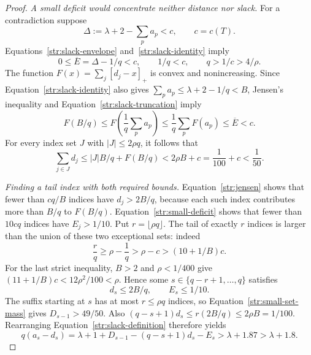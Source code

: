 \begin{proof}
\textit{A small deficit would concentrate neither distance nor slack.}
For a contradiction suppose
\[
 \Delta:=\lambda+2-\sum_pa_p<c,
 \qquad c=c(T).
\]
Equations~\eqref{str:slack-envelope} and~\eqref{str:slack-identity} imply
\begin{equation}\label{str:small-deficit}
 0\le\overline E=\Delta-1/q<c,
 \qquad 1/q<c,\qquad q>1/c>4/\rho.
\end{equation}
The function $F(x)=\sum_j[d_j-x]_+$ is convex and nonincreasing.
Since Equation~\eqref{str:slack-identity} also gives
$\sum_pa_p\le\lambda+2-1/q<B$, Jensen's inequality and
Equation~\eqref{str:slack-truncation} imply
\begin{equation}\label{str:jensen}
 F(B/q)\le F\left(\frac1q\sum_pa_p\right)
 \le\frac1q\sum_p F(a_p)\le\overline E<c.
\end{equation}
For every index set $J$ with $|J|\le2\rho q$, it follows that
\begin{equation}\label{str:small-set-mass}
 \sum_{j\in J}d_j
 \le |J|B/q+F(B/q)<2\rho B+c
 =\frac1{100}+c<\frac1{50}.
\end{equation}

\textit{Finding a tail index with both required bounds.}
Equation~\eqref{str:jensen} shows that fewer than $cq/B$ indices have
$d_j>2B/q$, because each such index contributes more than $B/q$ to
$F(B/q)$.  Equation~\eqref{str:small-deficit} shows that fewer than
$10cq$ indices have $E_j>1/10$.  Put $r=\lfloor\rho q\rfloor$.
The tail of exactly $r$ indices is larger than the union of these two
exceptional sets: indeed
\[
 \frac rq\ge\rho-\frac1q>\rho-c>(10+1/B)c.
\]
For the last strict inequality, $B>2$ and $\rho<1/400$ give
$(11+1/B)c<12\rho^2/100<\rho$.
Hence some $s\in\{q-r+1,\ldots,q\}$ satisfies
\begin{equation}\label{str:tail-index}
 d_s\le2B/q,\qquad E_s\le1/10.
\end{equation}
The suffix starting at $s$ has at most $r\le\rho q$ indices, so
Equation~\eqref{str:small-set-mass} gives $D_{s-1}>49/50$.
Also $(q-s+1)d_s\le r(2B/q)\le2\rho B=1/100$.
Rearranging Equation~\eqref{str:slack-definition} therefore yields
\begin{equation}\label{str:tail-large}
 q(a_s-d_s)=\lambda+1+D_{s-1}-(q-s+1)d_s-E_s
 >\lambda+1.87>\lambda+1.8.
\end{equation}


\end{proof}
